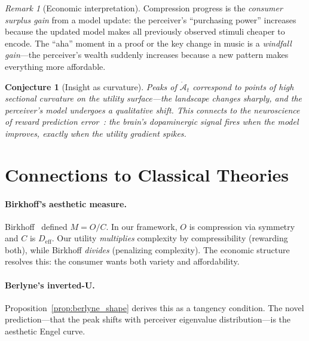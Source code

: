 \documentclass[journal]{IEEEtran}
\newtheorem{conjecture}[theorem]{Conjecture}
\theoremstyle{definition}
\theoremstyle{remark}
\newtheorem{remark}[theorem]{Remark}
\begin{document}
\begin{remark}[Economic interpretation]
Compression progress is the \emph{consumer surplus gain} from a
model update: the perceiver's ``purchasing power'' increases because
the updated model makes all previously observed stimuli cheaper to
encode.  The ``aha'' moment in a proof or the key change in music
is a \emph{windfall gain}---the perceiver's wealth suddenly
increases because a new pattern makes everything more affordable.
\end{remark}

\begin{conjecture}[Insight as curvature]
\label{conj:insight}
Peaks of $\dot{\mathcal{A}}_t$ correspond to points of high
\emph{sectional curvature} on the utility surface---the landscape
changes sharply, and the perceiver's model undergoes a qualitative
shift.  This connects to the neuroscience of reward prediction
error~\cite{salimpoor2011anatomically}: the brain's dopaminergic
signal fires when the model improves, exactly when the utility
gradient spikes.
\end{conjecture}


\section{Connections to Classical Theories}
\label{sec:connections}

\paragraph{Birkhoff's aesthetic measure.}
Birkhoff~\cite{birkhoff1933aesthetic} defined $M = O/C$.  In our
framework, $O$ is compression via symmetry and $C$ is
$D_{\mathrm{eff}}$.  Our utility \emph{multiplies} complexity by
compressibility (rewarding both), while Birkhoff \emph{divides}
(penalizing complexity).  The economic structure resolves this: the
consumer wants both variety and affordability.

\paragraph{Berlyne's inverted-U.}
Proposition~\ref{prop:berlyne_shape} derives this as a tangency
condition.  The novel prediction---that the peak shifts with
perceiver eigenvalue distribution---is the aesthetic Engel curve.
\end{document}
